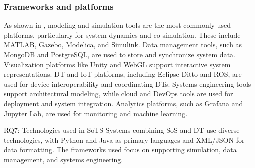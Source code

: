 \subsubsection{Frameworks and platforms}\label{sec:frameworks}

As shown in , modeling and simulation tools are the most commonly used platforms, particularly for system dynamics and co-simulation. These include MATLAB, Gazebo, Modelica, and Simulink. Data management tools, such as MongoDB and PostgreSQL, are used to store and synchronize system data. Visualization platforms like Unity and WebGL support interactive system representations. DT and IoT platforms, including Eclipse Ditto and ROS, are used for device interoperability and coordinating DTs. Systems engineering tools support architectural modeling, while cloud and DevOps tools are used for deployment and system integration. Analytics platforms, such as Grafana and Jupyter Lab, are used for monitoring and machine learning.

\begin{conclusionframe}{RQ7: Technologies used in SoTS}
Systems combining SoS and DT use diverse technologies, with Python and Java as primary languages and XML/JSON for data formatting. The frameworks used focus on supporting simulation, data management, and systems engineering.
\end{conclusionframe}
